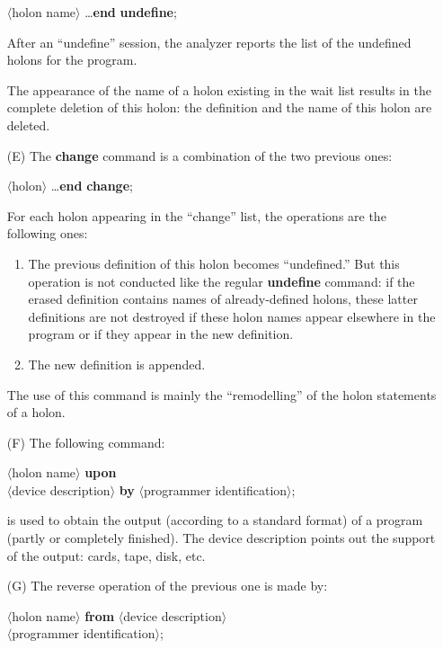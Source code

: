 \documentclass[openany,nobib]{tufte-book}
\newcommand{\kw}[1]{{\bf #1}}
\newcommand{\sym}[1]{$\langle$#1$\rangle$}
\begin{document}
\begin{itemize}
    \smallskip
    \-\hspace{0.3cm}\kw{undefine} \sym{holon name} \dots \kw{end}
\kw{undefine};

    \smallskip
    After an ``undefine'' session, the analyzer reports the list of the
undefined holons for the program.

    The appearance of the name of a holon existing in the wait list results in
the complete deletion of this holon: the definition and the name of this holon
are deleted.
    \item[(E)] The \kw{change} command is a combination of the two previous
ones:

    \smallskip
    \-\hspace{0.3cm}\kw{change} \sym{holon} \dots \kw{end} \kw{change};

    \smallskip
    For each holon appearing in the ``change'' list, the operations are the
following ones:
    \begin{enumerate}
        \item The previous definition of this holon becomes ``undefined.'' But
this operation is not conducted like the regular \kw{undefine} command: if the
erased definition contains names of already-defined holons, these latter
definitions are not destroyed if these holon names appear elsewhere in the
program or if they appear in the new definition.
        \item The new definition is appended.
    \end{enumerate}
    The use of this command is mainly the ``remodelling'' of the holon
statements of a holon.
    \item[(F)] The following command:

    \smallskip
    \-\hspace{0.3cm}\kw{output analyzed program} \sym{holon name} \kw{upon}\\
    \-\hspace{0.6cm}\sym{device description} \kw{by} \sym{programmer
identification};

    \smallskip
    is used to obtain the output (according to a standard format) of a program
(partly or completely finished). The device description points out the support
of the output: cards, tape, disk, etc.
    \item[(G)] The reverse operation of the previous one is made by:

    \smallskip
    \-\hspace{0.3cm}\kw{program} \sym{holon name} \kw{from} \sym{device
description}\\
    \-\hspace{0.6cm}\kw{by} \sym{programmer identification};
\end{itemize}
\end{document}
